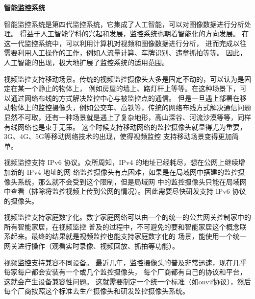 \noindent \textbf{智能监控系统}

智能监控系统是第四代监控系统，它集成了人工智能，可以对图像数据进行分析处理。
得益于人工智能学科的兴起和发展，监控系统也朝着智能化的方向发展\cite{邵爱菊2015智能视频监控系统}。
在这一代监控系统中，可以利用计算机对视频和图像数据进行分析，
进而完成以往需要利用人工操作的工作，例如人流量计算、车牌识别、违章抓拍等等。
因此，人工智能的出现，极大地扩展了监控系统的适用范围。

视频监控支持移动场景。传统的视频监控摄像头大多是固定不动的，可以认为是固定在某一个静止的物体上，
例如房屋的墙上、路灯杆上等等。在这种场景下，可以通过网络布线的方式解决监控中心与被监控点的通信。
但是一旦遇上部署在移动物体上的监控摄像头，例如公交车、高铁等，传统的网络布线方式解决通信问题
显然不可取，还有一种场景就是遇上了复杂地形，高山深谷、河流沙漠等等，同样有线网络也是束手无策。
这个时候支持移动网络的监控摄像头就显得尤为重要，3G、4G、5G等移动网络技术的出现，使得视频监控
支持移动场景变得更加简单\cite{雷俊智2008移动视频监控技术应用研究}。

视频监控支持 IPv6 协议。众所周知，IPv4 的地址已经耗尽，想在公网上继续增加新的 IPv4 地址的网
络监控摄像头有点困难，如果是在局域网中搭建的监控摄像头系统，那么就不会受到这个限制，但是局域网
中的监控摄像头只能在局域网中查看（排除将监控视频上传到公网的情况）。因此需要尽快研发支持 IPv6
协议的摄像头。

视频监控支持家庭数字化。数字家庭网络可以由一个的统一的公共网关控制家中的所有智能家居，在视频监控
普及的过程中，不可避免的要和智能家居这个概念联系起来。最终的结果就是视频监控也能支持家庭数字化的
场景，能使用一个统一网关进行操作（观看实时录像、视频回放、抓拍等功能）\cite{丁瑞云2017家庭监控系统的发展}。

视频监控支持兼容不同设备。
最近几年，监控摄像头的普及非常迅速，现在几乎每家每户都会安装有一个或几个监控摄像头，
每个厂商都有自己的协议和平台，这就会产生设备兼容性问题。
这就需要制定一个统一个标准（如onvif协议\cite{陈少尉2014基于}），然后每个厂商按照这个标准去生产摄像头和研发监控摄像头系统。

